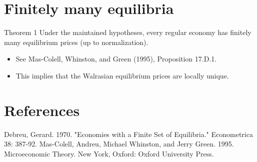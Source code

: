 \documentclass[10pt]{article}
\begin{document}
\section*{Finitely many equilibria}
Theorem 1 Under the maintained hypotheses, every regular economy has finitely many equilibrium prices (up to normalization).

\begin{itemize}
  \item See Mas-Colell, Whinston, and Green (1995), Proposition 17.D.1.
  \item This implies that the Walrasian equilibrium prices are locally unique.
\end{itemize}

\section*{References}
Debreu, Gerard. 1970. "Economies with a Finite Set of Equilibria." Econometrica 38: 387-92. Mas-Colell, Andreu, Michael Whinston, and Jerry Green. 1995. Microeconomic Theory. New York, Oxford: Oxford University Press.
\end{document}
